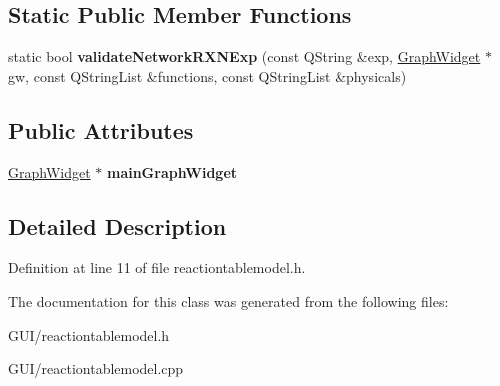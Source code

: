 \subsection*{Static Public Member Functions}
\begin{DoxyCompactItemize}
\item 
\mbox{\label{class_reaction_table_model_a4870cb81bf2efc0ddf9d6a79f48d44fe}} 
static bool {\bfseries validate\+Network\+R\+X\+N\+Exp} (const Q\+String \&exp, \hyperlink{class_graph_widget}{Graph\+Widget} $\ast$gw, const Q\+String\+List \&functions, const Q\+String\+List \&physicals)
\end{DoxyCompactItemize}
\subsection*{Public Attributes}
\begin{DoxyCompactItemize}
\item 
\mbox{\label{class_reaction_table_model_aca74a7fb1fa1913968785b46e18b8c9c}} 
\hyperlink{class_graph_widget}{Graph\+Widget} $\ast$ {\bfseries main\+Graph\+Widget}
\end{DoxyCompactItemize}


\subsection{Detailed Description}


Definition at line 11 of file reactiontablemodel.\+h.



The documentation for this class was generated from the following files\+:\begin{DoxyCompactItemize}
\item 
G\+U\+I/reactiontablemodel.\+h\item 
G\+U\+I/reactiontablemodel.\+cpp\end{DoxyCompactItemize}
